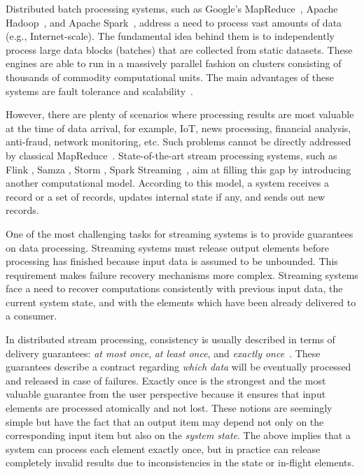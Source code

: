 
\label {fs-intro-seciton}

Distributed batch processing systems, such as Google's MapReduce~\cite{Dean:2008:MSD:1327452.1327492}, Apache Hadoop~\cite{hadoop2009hadoop}, and Apache Spark~\cite{Zaharia:2016:ASU:3013530.2934664}, address a need to process vast amounts of data (e.g., Internet-scale). The fundamental idea behind them is to independently process large data blocks (batches) that are collected from static datasets. These engines are able to run in a massively parallel fashion on clusters consisting of thousands of commodity computational units. The main advantages of these systems are fault tolerance and scalability~\cite{borthakur2011apache}.

However, there are plenty of scenarios where processing results are most valuable at the time of data arrival, for example, IoT, news processing, financial analysis, anti-fraud, network monitoring, etc. Such problems cannot be directly addressed by classical MapReduce~\cite{Doulkeridis:2014:SLA:2628707.2628782}. State-of-the-art stream processing systems, such as Flink \cite{carbone2015apache}, Samza \cite{Noghabi:2017:SSS:3137765.3137770}, Storm \cite{apache:storm}, Spark Streaming~\cite{Zaharia:2012:DSE:2342763.2342773}, aim at filling this gap by introducing another computational model. According to this model, a system receives a record or a set of records, updates internal state if any, and sends out new records. 

One of the most challenging tasks for streaming systems is to provide guarantees on data processing. Streaming systems must release output elements before processing has finished because input data is assumed to be unbounded. This requirement makes failure recovery mechanisms more complex. Streaming systems face a need to recover computations consistently with previous input data, the current system state, and with the elements which have been already delivered to a consumer. 

In distributed stream processing, consistency is usually described in terms of delivery guarantees: {\em at most once}, {\em at least once}, and {\em exactly once}~\cite{carbone2015apache}. These guarantees describe a contract regarding {\em which data} will be eventually processed and released in case of failures. Exactly once is the strongest and the most valuable guarantee from the user perspective because it ensures that input elements are processed atomically and not lost. These notions are seemingly simple but have the fact that an output item may depend not only on the corresponding input item but also on the {\em system state}. The above implies that a system can process each element exactly once, but in practice can release completely invalid results due to inconsistencies in the state or in-flight elements.

